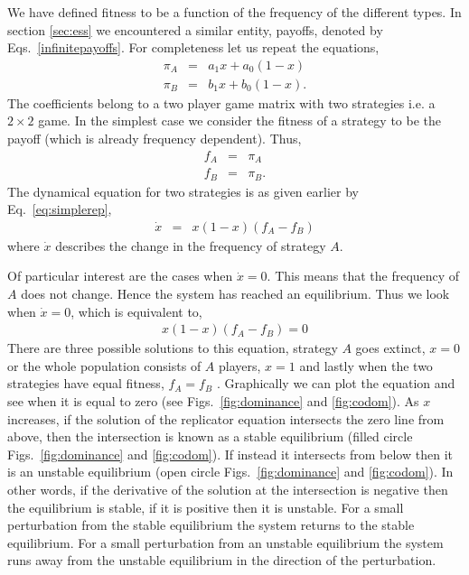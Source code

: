 \documentclass[oneside,11pt,a4paper]{book}
\begin{document}
We have defined fitness to be a function of the frequency of the different types.
In section \ref{sec:ess} we encountered a similar entity, payoffs, denoted by Eqs.\ \eqref{infinitepayoffs}.
For completeness let us repeat the equations,
%
\begin{eqnarray}
\pi_A &=& a_1 x + a_0 (1-x) \nonumber \\ 
\pi_B &=& b_1 x + b_0 (1-x). \nonumber
\end{eqnarray}
%
The coefficients belong to a two player game matrix with two strategies i.e. a $2 \times 2$ game.
In the simplest case we consider the fitness of a strategy to be the payoff (which is already frequency dependent).
Thus,
%
\begin{eqnarray}
f_A &=& \pi_A \\
f_B &=& \pi_B.
\end{eqnarray}
%
The dynamical equation for two strategies is as given earlier by Eq.\ \eqref{eq:simplerep},
%
\begin{eqnarray}
\dot{x} &=& x (1-x) \left(f_A - f_B \right) \nonumber
\end{eqnarray}
%
where $\dot{x}$ describes the change in the frequency of strategy $A$.

Of particular interest are the cases when $\dot{x} = 0$.
This means that the frequency of $A$ does not change.
Hence the system has reached an equilibrium.
Thus we look when $\dot{x} = 0$, which is equivalent to,
%
\begin{eqnarray}
x (1-x) (f_A - f_B) = 0
\end{eqnarray}
%
There are three possible solutions to this equation,
strategy $A$ goes extinct, $x=0$ or the whole population consists of $A$ players, $x=1$ and lastly when the two strategies have equal fitness, $f_A = f_B$ \citep{bishop:1976aa}.
Graphically we can plot the equation and see when it is equal to zero (see Figs.\ \ref{fig:dominance} and \ref{fig:codom}).
As $x$ increases, if the solution of the replicator equation intersects the zero line from above, then the intersection is known as a stable equilibrium (filled circle Figs.\ \ref{fig:dominance} and \ref{fig:codom}).
If instead it intersects from below then it is an unstable equilibrium (open circle Figs.\ \ref{fig:dominance} and \ref{fig:codom}).
In other words, if the derivative of the solution at the intersection is negative then the equilibrium is stable, if it is positive then it is unstable.
For a small perturbation from the stable equilibrium the system returns to the stable equilibrium.
For a small perturbation from an unstable equilibrium the system runs away from the unstable equilibrium in the direction of the perturbation.
\end{document}

